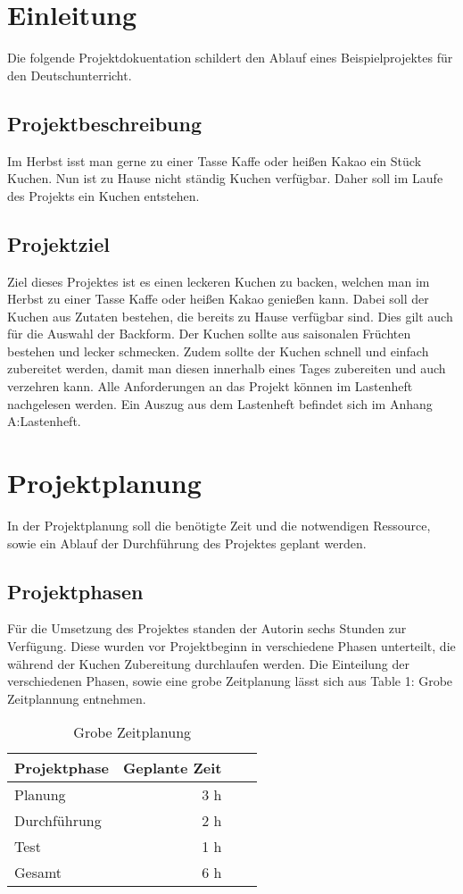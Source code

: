 \section{Einleitung}
Die folgende Projektdokuentation schildert den Ablauf eines Beispielprojektes für den Deutschunterricht.
\subsection{Projektbeschreibung}
Im Herbst isst man gerne zu einer Tasse Kaffe oder heißen Kakao ein Stück Kuchen. Nun ist zu Hause nicht ständig Kuchen verfügbar. Daher soll im Laufe des Projekts
ein Kuchen entstehen.
\subsection{Projektziel}
Ziel dieses Projektes ist es einen leckeren Kuchen zu backen, welchen man im Herbst zu einer Tasse Kaffe oder heißen Kakao genießen kann.
Dabei soll der Kuchen aus Zutaten bestehen, die bereits zu Hause verfügbar sind. Dies gilt auch für die Auswahl der Backform.
Der Kuchen sollte aus saisonalen Früchten bestehen und lecker schmecken. Zudem sollte der Kuchen schnell und einfach zubereitet werden,
damit man diesen innerhalb eines Tages zubereiten und auch verzehren kann. Alle Anforderungen an das Projekt können im Lastenheft nachgelesen werden.
Ein Auszug aus dem Lastenheft befindet sich im Anhang A:Lastenheft.

\section{Projektplanung}
In der Projektplanung soll die benötigte Zeit und die notwendigen Ressource, sowie ein Ablauf der Durchführung 
des Projektes geplant werden.
\subsection{Projektphasen}
Für die Umsetzung des Projektes standen der Autorin sechs Stunden zur Verfügung. Diese wurden vor Projektbeginn in verschiedene Phasen
unterteilt, die während der Kuchen Zubereitung durchlaufen werden. Die Einteilung der verschiedenen Phasen, sowie eine grobe Zeitplanung lässt sich aus Table 1: Grobe Zeitplannung entnehmen.
\begin{table}[h]
    \centering
    \begin{tabular}{l*{2}{r}r|}
        \hline
        Projektphase    & Geplante Zeit \\
        \hline
        Planung & 3 h\\
        Durchführung    & 2 h  \\
        Test      & 1 h   \\
        \hline
        Gesamt & 6 h \\
        \hline
        \end{tabular}
        \caption{Grobe Zeitplanung}
\end{table}
